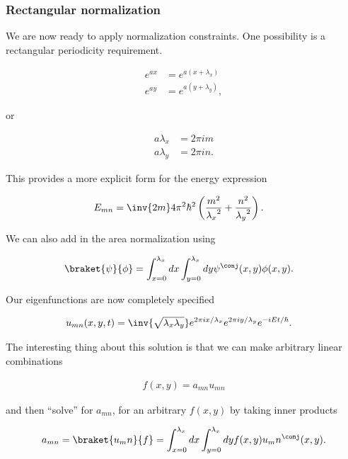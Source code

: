 \subsubsection{Rectangular normalization}

We are now ready to apply normalization constraints.  One possibility is a rectangular periodicity requirement.

\begin{align}\label{eqn:desaiCh4:107}
e^{ax} &= e^{a(x + \lambda_x)} \\
e^{ay} &= e^{a(y + \lambda_y)} ,
\end{align}

or

\begin{align}\label{eqn:desaiCh4:108}
a\lambda_x &= 2 \pi i m \\
a\lambda_y &= 2 \pi i n.
\end{align}

This provides a more explicit form for the energy expression

\begin{align}\label{eqn:desaiCh4:109}
E_{mn} &= \inv{2m} 4 \pi^2 \hbar^2 \left( 
\frac{m^2}{{\lambda_x}^2}
+\frac{n^2}{{\lambda_y}^2}
\right).
\end{align}

We can also add in the area normalization using 

\begin{align}\label{eqn:desaiCh4:110}
\braket{\psi}{\phi} &= 
\int_{x=0}^{\lambda_x} dx
\int_{y=0}^{\lambda_x} dy \psi^\conj(x,y) \phi(x,y).
\end{align}

Our eigenfunctions are now completely specified

\begin{align}\label{eqn:desaiCh4:111}
u_{mn}(x,y,t) &= \inv{\sqrt{\lambda_x \lambda_y}}
e^{2 \pi i x/\lambda_x}
e^{2 \pi i y/\lambda_y}
e^{-iE t/\hbar}.
\end{align}

The interesting thing about this solution is that we can make arbitrary linear combinations

\begin{align}\label{eqn:desaiCh4:112}
f(x,y) = a_{mn} u_{mn}
\end{align}

and then ``solve'' for $a_{mn}$, for an arbitrary $f(x,y)$ by taking inner products

\begin{align}\label{eqn:desaiCh4:113}
a_{mn} = \braket{u_mn}{f} =
\int_{x=0}^{\lambda_x} dx 
\int_{y=0}^{\lambda_x} dy f(x,y) u_mn^\conj(x,y).
\end{align}

